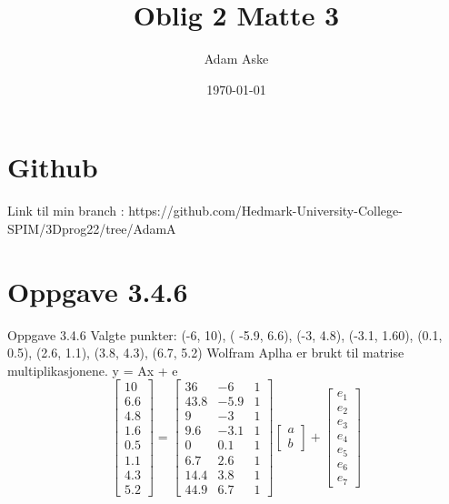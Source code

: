 \documentclass[a4paper,norsk]{article}
\title{Oblig 2 Matte 3}
\date{\today}
\author{Adam Aske}
\begin{document}
\maketitle
\tableofcontents
{}
\newpage
 \section{Github}
Link til min branch : https://github.com/Hedmark-University-College-SPIM/3Dprog22/tree/AdamA

\section{Oppgave 3.4.6}
Oppgave 3.4.6
Valgte punkter: (-6, 10), ( -5.9, 6.6), (-3, 4.8), (-3.1, 1.60), (0.1, 0.5), (2.6, 1.1), (3.8, 4.3), (6.7, 5.2)\newline
Wolfram Aplha er brukt til matrise multiplikasjonene. \newline
y = Ax + e \newline
\begin{equation*} 
\begin{bmatrix}10 \\ 6.6\\4.8\\1.6\\0.5\\1.1\\4.3\\5.2\end{bmatrix}
=\begin{bmatrix}36 & -6 & 1 \\ 43.8 & -5.9 & 1 \\9 & -3 & 1 \\ 9.6 & -3.1 & 1 \\0 & 0.1 & 1 \\6.7& 2.6 & 1 \\14.4 & 3.8 & 1 \\ 44.9 & 6.7 & 1\end{bmatrix}\begin{bmatrix}a\\b\end{bmatrix}
+ \begin{bmatrix} e_1 \\ e_2 \\ e_3 \\ e_4 \\ e_5 \\ e_6 \\ e_7\end{bmatrix}
\end{equation*}
\end{document}
